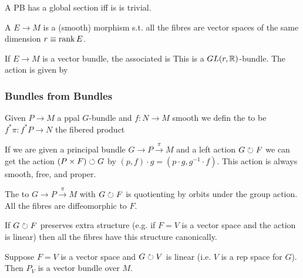 \documentclass{article}
\begin{document}
\begin{lemma}
A PB has a global section iff is is trivial. 
\end{lemma}

\begin{definition}
A  $E \to M$ is a (smooth) morphism s.t. all the fibres are vector spaces of the same dimension $r\equiv\operatorname{rank} E$. 
\end{definition}

\begin{definition}
If $E \to M$ is a vector bundle, the associated  is 
This is a $GL(r,\mathbb{R})$-bundle. The action is given by 
\end{definition}

\subsubsection{Bundles from Bundles}
\begin{definition}
	Given $P \to M$ a ppal $G$-bundle and $f:N \to M$ smooth we defin the  to be 
	$f^\ast \pi : f^\ast P \to N$ the fibered product 
\end{definition}

If we are given a principal bundle $G \to P \overset{\pi}{\to} M$ and a left action $G \circlearrowright F$ we can get the action $(P \times F) \circlearrowleft G$ by $(p,f) \cdot g = (p\cdot g, g^{-1} \cdot f)$. This action is always smooth, free, and proper. 

\begin{definition}
The  to $G \to P \overset{\pi}{\to} M$ with $G \circlearrowright F$ is 
quotienting by orbits under the group action. All the fibres are diffeomorphic to $F$. 
\end{definition}

If $G \circlearrowright F$ preserves extra structure (e.g. if $F=V$ is a vector space and the action is linear) then all the fibres have this structure canonically. 

\begin{example}
Suppose $F=V$ is a vector space and $G \circlearrowright V$ is linear (i.e. $V$ is a rep space for $G$). Then $P_V$ is a vector bundle over $M$. 
\end{example}
\end{document}
